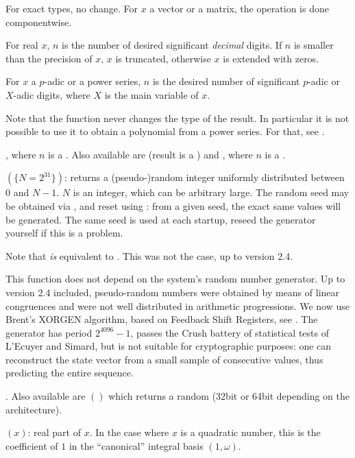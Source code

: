 For exact types, no change. For $x$ a vector or a matrix, the operation
is done componentwise.

For real $x$, $n$ is the number of desired significant \emph{decimal} digits.
If $n$ is smaller than the precision of $x$, $x$ is truncated, otherwise $x$
is extended with zeros.

For $x$ a $p$-adic or a power series, $n$ is the desired number of
significant $p$-adic or $X$-adic digits, where $X$ is the main variable of
$x$.

Note that the function  never changes the type of the result.
In particular it is not possible to use it to obtain a polynomial from a
power series. For that, see .

, where $n$ is a . Also available are
 (result is a ) and , where
$n$ is a .

$(\{N=2^{31}\})$: returns a (pseudo-)random integer
uniformly distributed between $0$ and $N-1$. $N$ is an integer, which can be
arbitrary large. The random seed may be obtained via , and reset
using : from a given seed, the exact same values will be
generated. The same seed is used at each startup, reseed the generator
yourself if this is a problem.

Note that  \emph{is} equivalent to . This
was not the case, up to version 2.4.

This function does not depend on the system's random number generator. Up to
version 2.4 included, pseudo-random numbers were obtained by means of linear
congruences and were not well distributed in arithmetic progressions. We now
use Brent's XORGEN algorithm, based on Feedback Shift Registers, see
. The generator has period
$2^{4096}-1$, passes the Crush battery of statistical tests of L'Ecuyer and
Simard, but is not suitable for cryptographic purposes: one can reconstruct
the state vector from a small sample of consecutive values, thus predicting
the entire sequence.

. Also available are $()$ which returns a
random  (32bit or 64bit depending on the architecture).

$(x)$: real part of $x$. In the case where $x$ is a quadratic
number, this is the coefficient of $1$ in the ``canonical'' integral basis
$(1,\omega)$.

